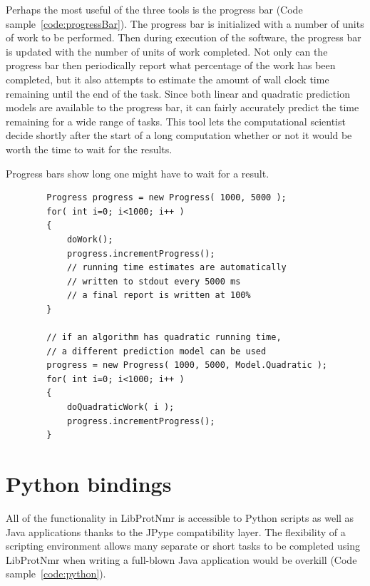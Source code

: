 \documentclass[11pt]{article}
\newcommand{\software}[1]{{\sc #1}}
\newcommand{\coderef}[1]{Code sample~\ref{#1}}
\newenvironment{codesample}
{
\begin{codesamplefloat}
\centering
\RecustomVerbatimEnvironment{Verbatim}{BVerbatim}{}
\vspace{0.1in}
}{
\end{codesamplefloat}
}
\newcommand{\libprotnmr}{\software{LibProtNmr}}
\begin{document}
Perhaps the most useful of the three tools is the progress bar (\coderef{code:progressBar}). The progress bar is initialized with a number of units of work to be performed. Then during execution of the software, the progress bar is updated with the number of units of work completed. Not only can the progress bar then periodically report what percentage of the work has been completed, but it also attempts to estimate the amount of wall clock time remaining until the end of the task. Since both linear and quadratic prediction models are available to the progress bar, it can fairly accurately predict the time remaining for a wide range of tasks. This tool lets the computational scientist decide shortly after the start of a long computation whether or not it would be worth the time to wait for the results.

\begin{codesample}
	\caption{
		Progress bars show long one might have to wait for a result.
	}
	\begin{verbatim}
		Progress progress = new Progress( 1000, 5000 );
		for( int i=0; i<1000; i++ )
		{
			doWork();
			progress.incrementProgress();
			// running time estimates are automatically
			// written to stdout every 5000 ms
			// a final report is written at 100%
		}
		
		// if an algorithm has quadratic running time,
		// a different prediction model can be used
		progress = new Progress( 1000, 5000, Model.Quadratic );
		for( int i=0; i<1000; i++ )
		{
			doQuadraticWork( i );
			progress.incrementProgress();
		}
	\end{verbatim}
	\label{code:progressBar}
\end{codesample}


\section{Python bindings}

All of the functionality in {\libprotnmr} is accessible to Python scripts as well as Java applications thanks to the JPype compatibility layer. The flexibility of a scripting environment allows many separate or short tasks to be completed using {\libprotnmr} when writing a full-blown Java application would be overkill (\coderef{code:python}).
\end{document}
